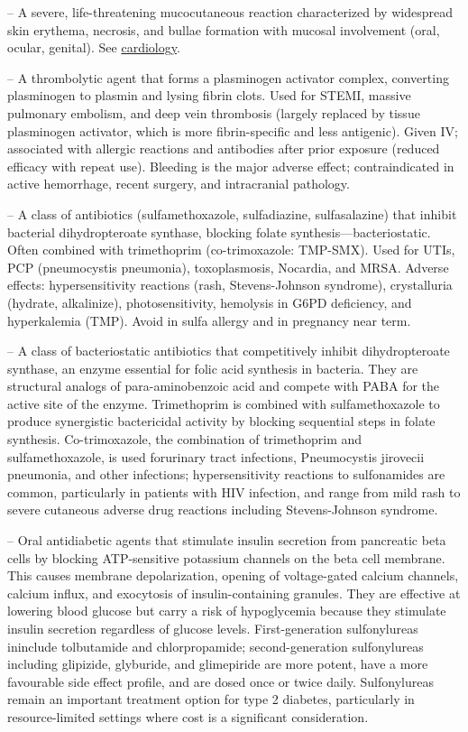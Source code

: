-- A severe, life-threatening mucocutaneous reaction characterized by widespread skin erythema, necrosis, and bullae formation with mucosal involvement (oral, ocular, genital). See \hyperlink{Cardiology}{cardiology}.

-- A thrombolytic agent that forms a plasminogen activator complex, converting plasminogen to plasmin and lysing fibrin clots. Used for STEMI, massive pulmonary embolism, and deep vein thrombosis (largely replaced by tissue plasminogen activator, which is more fibrin-specific and less antigenic). Given IV; associated with allergic reactions and antibodies after prior exposure (reduced efficacy with repeat use). Bleeding is the major adverse effect; contraindicated in active hemorrhage, recent surgery, and intracranial pathology.

-- A class of antibiotics (sulfamethoxazole, sulfadiazine, sulfasalazine) that inhibit bacterial dihydropteroate synthase, blocking folate synthesis—bacteriostatic. Often combined with trimethoprim (co-trimoxazole: TMP-SMX). Used for UTIs, PCP (pneumocystis pneumonia), toxoplasmosis, Nocardia, and MRSA. Adverse effects: hypersensitivity reactions (rash, Stevens-Johnson syndrome), crystalluria (hydrate, alkalinize), photosensitivity, hemolysis in G6PD deficiency, and hyperkalemia (TMP). Avoid in sulfa allergy and in pregnancy near term.

-- A class of bacteriostatic antibiotics that competitively inhibit dihydropteroate synthase, an enzyme essential for folic acid synthesis in bacteria. They are structural analogs of para-aminobenzoic acid and compete with PABA for the active site of the enzyme. Trimethoprim is combined with sulfamethoxazole to produce synergistic bactericidal activity by blocking sequential steps in folate synthesis. Co-trimoxazole, the combination of trimethoprim and sulfamethoxazole, is used forurinary tract infections, Pneumocystis jirovecii pneumonia, and other infections; hypersensitivity reactions to sulfonamides are common, particularly in patients with HIV infection, and range from mild rash to severe cutaneous adverse drug reactions including Stevens-Johnson syndrome.

-- Oral antidiabetic agents that stimulate insulin secretion from pancreatic beta cells by blocking ATP-sensitive potassium channels on the beta cell membrane. This causes membrane depolarization, opening of voltage-gated calcium channels, calcium influx, and exocytosis of insulin-containing granules. They are effective at lowering blood glucose but carry a risk of hypoglycemia because they stimulate insulin secretion regardless of glucose levels. First-generation sulfonylureas ininclude tolbutamide and chlorpropamide; second-generation sulfonylureas including glipizide, glyburide, and glimepiride are more potent, have a more favourable side effect profile, and are dosed once or twice daily. Sulfonylureas remain an important treatment option for type 2 diabetes, particularly in resource-limited settings where cost is a significant consideration.

